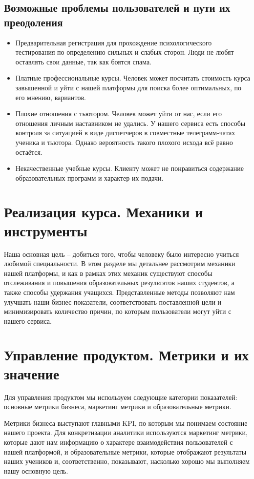\documentclass[12pt]{article}
\begin{document}
\subsection{Возможные проблемы пользователей и пути их преодоления}
\begin{itemize}
    \item Предварительная регистрация для прохождение психологического тестирования по определению сильных и слабых сторон. Люди не любят оставлять свои данные, так как боятся спама.
    \item Платные профессиональные курсы. Человек может посчитать стоимость курса завышенной и уйти с нашей платформы для поиска более оптимальных, по его мнению, вариантов.
    \item Плохие отношения с тьютором. Человек может уйти от нас, если его отношения личным наставником не удались. У нашего сервиса есть способы контроля за ситуацией в виде диспетчеров в совместные телеграмм-чатах ученика и тьютора. Однако вероятность такого плохого исхода всё равно остаётся.
    \item Некачественные учебные курсы. Клиенту может не понравиться содержание образовательных программ и характер их подачи.
\end{itemize}

\section{Реализация курса. Механики и инструменты}
Наша основная цель -- добиться того, чтобы человеку было интересно учиться любимой специальности. В этом разделе мы детальнее рассмотрим механики нашей платформы, и как в рамках этих механик существуют способы отслеживания и повышения образовательных результатов наших студентов, а также способы удержания учащихся. Представленные методы позволяют нам улучшать наши бизнес-показатели, соответствовать поставленной цели и минимизировать количество причин, по которым пользователи могут уйти с нашего сервиса.


\section{Управление продуктом. Метрики и их значение}
Для управления продуктом мы используем следующие категории показателей:
основные метрики бизнеса, маркетинг метрики и образовательные метрики.

Метрики бизнеса выступают главными KPI, по которым мы понимаем состояние нашего проекта. Для конкретизации аналитики используются маркетинг метрики, которые дают нам информацию о характере взаимодействия пользователей с нашей платформой, и образовательные метрики, которые отображают результаты наших учеников и, соответственно, показывают, насколько хорошо мы выполняем нашу основную цель.
\end{document}
